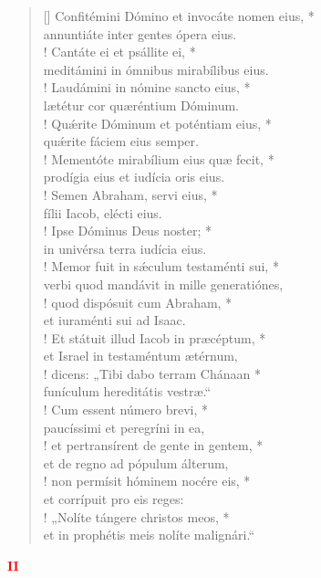 \begin{verse}[\versewidth]
Confitémini Dómino et invocáte nomen eius, *\\
annuntiáte inter gentes ópera eius.\\!
\vin Cantáte ei et psállite ei, *\\
\vin meditámini in ómnibus mirabílibus eius.\\!
Laudámini in nómine sancto eius, *\\
lætétur cor quæréntium Dóminum.\\!
\vin Qu\'{æ}rite Dóminum et poténtiam eius, *\\
\vin qu\'{æ}rite fáciem eius semper.\\!
Mementóte mirabílium eius quæ fecit, *\\
prodígia eius et iudícia oris eius.\\!
\vin Semen Abraham, servi eius, *\\
\vin fílii Iacob, elécti eius.\\!
Ipse Dóminus Deus noster; *\\
in univérsa terra iudícia eius.\\!
\vin Memor fuit in s\'{æ}culum testaménti sui, *\\
\vin verbi quod mandávit in mille generatiónes,\\!
quod dispósuit cum Abraham, *\\
et iuraménti sui ad Isaac.\\!
\vin Et státuit illud Iacob in præcéptum, *\\
\vin et Israel in testaméntum ætérnum,\\!
dicens: „Tibi dabo terram Chánaan *\\
funículum hereditátis vestræ.“\\!
\vin Cum essent número brevi, *\\
\vin paucíssimi et peregríni in ea,\\!
et pertransírent de gente in gentem, *\\
et de regno ad pópulum álterum,\\!
\vin non permísit hóminem nocére eis, *\\
\vin et corrípuit pro eis reges:\\!
„Nolíte tángere christos meos, *\\
et in prophétis meis nolíte malignári.“\\
\end{verse}
\begin{center}
\textcolor{red}{\bf II}
\end{center}
